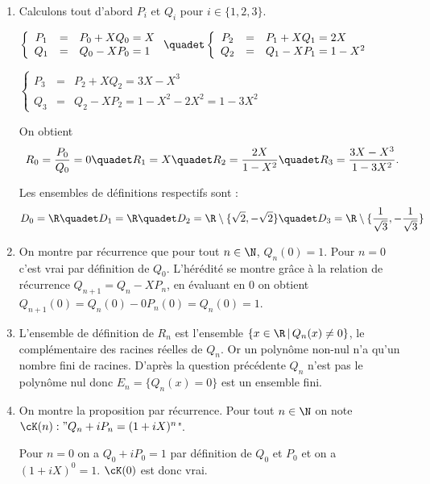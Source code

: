 \begin{correction}
\begin{enumerate}
\item Calculons tout d'abord $P_i$ et $Q_i$ pour $i\in \{1,2,3\} $. 

$\left\{\begin{array}{ccl}
P_{1} &=& P_0 + X Q_0= X\\
Q_{1} &=& Q_0 -XP_0=1
\end{array}
 \right. \quadet \left\{\begin{array}{ccl}
P_{2} &=& P_1 + X Q_1= 2X\\
Q_{2} &=& Q_1 -XP_1=1-X^2
\end{array}
 \right. $
 \vsec
 
 $\left\{\begin{array}{ccl}
P_{3} &=& P_2 + X Q_2= 3X-X^3\\
Q_{3} &=& Q_2 -XP_2=1-X^2-2X^2 = 1-3X^2
\end{array}
 \right. $
 \vsec 

On obtient 
$$R_0=\frac{P_0}{Q_0}=0 \quadet R_1 = X \quadet R_2 =\frac{2X}{1-X^2} \quadet  R_3=\frac{3X-X^3}{1-3X^2}.$$

Les ensembles de définitions respectifs sont : 
$$D_0 = \R\quadet D_1 = \R \quadet D_2 = \R\setminus\{ \sqrt{2},-\sqrt{2}\}\quadet D_3 = \R\setminus\{ \frac{1}{\sqrt{3}},-\frac{1}{\sqrt{3}}\}$$
\item On montre par récurrence que pour tout $n\in \N$, $Q_n(0)= 1$. Pour $n=0$ c'est vrai par définition de $Q_0$. L'hérédité se montre grâce à la relation de récurrence $Q_{n+1} =Q_n -XP_n$, en évaluant en $0$ on obtient $Q_{n+1} (0) = Q_n(0) -0 P_n(0 ) = Q_n(0)=1$. 

\item L'ensemble de définition de $R_n$ est l'ensemble $\{ x \in \R\, |\, Q_n(x)\neq 0\}$, le complémentaire des racines réelles de $Q_n$. 
Or un polynôme non-nul n'a qu'un nombre fini de racines. D'après la question précédente $Q_n$ n'est pas le polynôme nul donc $E_n =\{ Q_n(x) = 0\}$ est un ensemble fini. 
  


\item On montre la proposition par récurrence. 
Pour tout $n\in \N$ on note $\cK(n): "  Q_n +iP_n = (1+iX)^n $". 

Pour $n=0$ on a $Q_0+iP_0 = 1$ par définition de $Q_0$ et $P_0$ et on a $(1+iX)^0 = 1$. 
$\cK(0)$ est donc vrai. 


\end{enumerate}
\end{correction}
